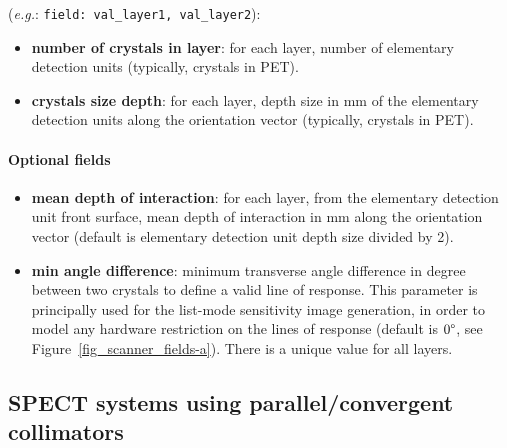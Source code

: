 \documentclass[a4paper, 11pt]{article}
\begin{document}
({\it e.g.}: \texttt{field: val\_layer1, val\_layer2}):
\begin{itemize}
  \item \textbf{number of crystals in layer}: for each layer, number of elementary detection units (typically, crystals in PET).
  \item \textbf{crystals size depth}: for each layer, depth size in mm of the elementary detection units along the orientation vector (typically,
        crystals in PET).
\end{itemize}

\paragraph{Optional fields}
\begin{itemize}
  \item \textbf{mean depth of interaction}: for each layer, from the elementary detection unit front surface, mean depth of interaction in mm along
        the orientation vector  (default is elementary detection unit depth size divided by 2).
  \item \textbf{min angle difference}: minimum transverse angle difference in degree between two crystals to define a valid line of response.
        This parameter is principally used for the list-mode sensitivity image generation, in order to model any hardware restriction on the lines
        of response (default is $0\degree$,  see Figure~\ref{fig_scanner_fields-a}). There is a unique value for all layers. 
        
\end{itemize}

\newpage
\subsection{SPECT systems using parallel/convergent collimators}
\label{ss_scanner_integration_SPECT_conv}
\end{document}
